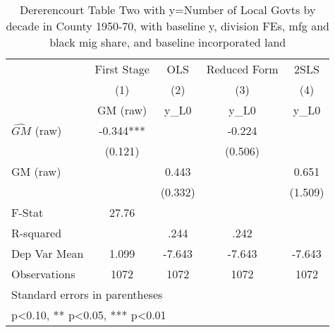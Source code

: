 \begin{table}[htbp]\centering
\def\sym#1{\ifmmode^{#1}\else\(^{#1}\)\fi}
\caption{Dererencourt Table Two with y=Number of Local Govts by decade in County 1950-70, with baseline y, division FEs, mfg and black mig share, and baseline incorporated land}
\begin{tabular}{l*{4}{c}}
\toprule
                    & First Stage   &         OLS   &Reduced Form   &        2SLS   \\
                    &\multicolumn{1}{c}{(1)}&\multicolumn{1}{c}{(2)}&\multicolumn{1}{c}{(3)}&\multicolumn{1}{c}{(4)}\\
                    &\multicolumn{1}{c}{GM  (raw)}&\multicolumn{1}{c}{y\_L0}&\multicolumn{1}{c}{y\_L0}&\multicolumn{1}{c}{y\_L0}\\
\midrule
$\hat{GM}$ (raw)    &      -0.344***&               &      -0.224   &               \\
                    &     (0.121)   &               &     (0.506)   &               \\
\addlinespace
GM  (raw)           &               &       0.443   &               &       0.651   \\
                    &               &     (0.332)   &               &     (1.509)   \\
\midrule
F-Stat              &       27.76   &               &               &               \\
R-squared           &               &        .244   &        .242   &               \\
Dep Var Mean        &       1.099   &      -7.643   &      -7.643   &      -7.643   \\
Observations        &        1072   &        1072   &        1072   &        1072   \\
\bottomrule
\multicolumn{5}{l}{\footnotesize Standard errors in parentheses}\\
\multicolumn{5}{l}{\footnotesize * p<0.10, ** p<0.05, *** p<0.01}\\
\end{tabular}
\end{table}
